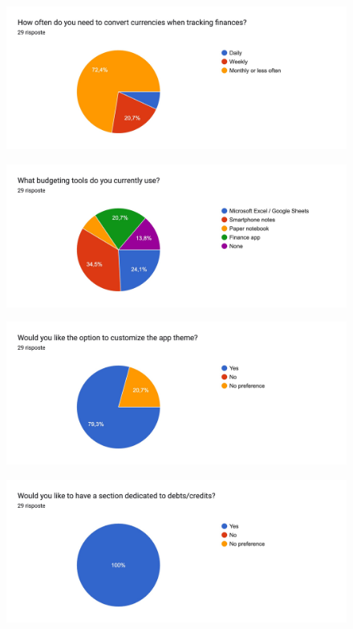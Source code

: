 \documentclass[a4paper,12pt]{article}
\begin{document}
\begin{figure}[H]
    \centering
    \includegraphics[width=\linewidth]{imagequest2.jpg}
\end{figure}

\begin{figure}[H]
    \centering
    \includegraphics[width=\linewidth]{imagequest3.jpg}
\end{figure}

\begin{figure}[H]
    \centering
    \includegraphics[width=\linewidth]{imagequest4.jpg}
\end{figure}

\begin{figure}[H]
    \centering
    \includegraphics[width=\linewidth]{imagequest5.jpg}
\end{figure}
\end{document}
